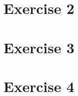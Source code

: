 \documentclass[10pt, titlepage, oneside, a4paper]{article}
\newcommand{\Section}[1]{\section{#1}\vspace{-8pt}}
\newcounter{appendixpage}
\newenvironment{appendices}{
	\setcounter{appendixpage}{\arabic{page}}
	\stepcounter{appendixpage}
}{
}
\newcommand{\appitem}[2]{
	\stepcounter{section}
	\addtocontents{toc}{\protect\contentsline{section}{\numberline{\Alph{section}}#1}{\arabic{appendixpage}}}
	\addtocounter{appendixpage}{#2}
}
\newcommand{\appsubitem}[2]{
	\stepcounter{subsection}
	\addtocontents{toc}{\protect\contentsline{subsection}{\numberline{\Alph{section}.\arabic{subsection}}#1}{\arabic{appendixpage}}}
	\addtocounter{appendixpage}{#2}
}
\begin{document}
	\FloatBarrier
	\Section{Exercise 2}
			

	\FloatBarrier
	\Section{Exercise 3}
	
	
	\FloatBarrier
	\Section{Exercise 4}
	
		

%
%
\end{document}
